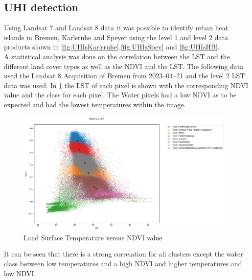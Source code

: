 \documentclass[a4paper, english]{article}
\begin{document}
\subsection{UHI detection}
Using Landsat 7 and Landsat 8  data it was possible to identify urban heat islands in Bremen, Karlsruhe and Speyer using the level 1 and level 2 data products shown in \cref{fig:UHIsKarlsruhe},\cref{fig:UHIsSpey} and \cref{fig:UHIsHB}.
\\
A statistical analysis was done on the correlation between the \ac{LST} and the different land cover types as well as the \ac{NDVI} and the \ac{LST}.
The following data used the Landsat 8 Acquisition of Bremen from 2023--04--21 and the level 2 \ac{LST} data was used.
In \cref{fig:ndviVsLst} the \ac{LST} of each pixel is shown with the corresponding \ac{NDVI} value and the class for each pixel.
The Water pixels had a low \ac{NDVI} as to be expected and had the lowest temperatures within the image. 
%
\begin{figure}[!htbp]
    \centering
    \includegraphics[width=0.97\textwidth]{img/NDVI vs LST.png}
    \caption{Land Surface Temperature versus \ac{NDVI} value\label{fig:ndviVsLst}}
\end{figure}
It can be seen that there is a strong correlation for all clusters except the water class between low temperatures and a high \ac{NDVI} and higher temperatures and low \ac{NDVI}. 
%
\end{document}
